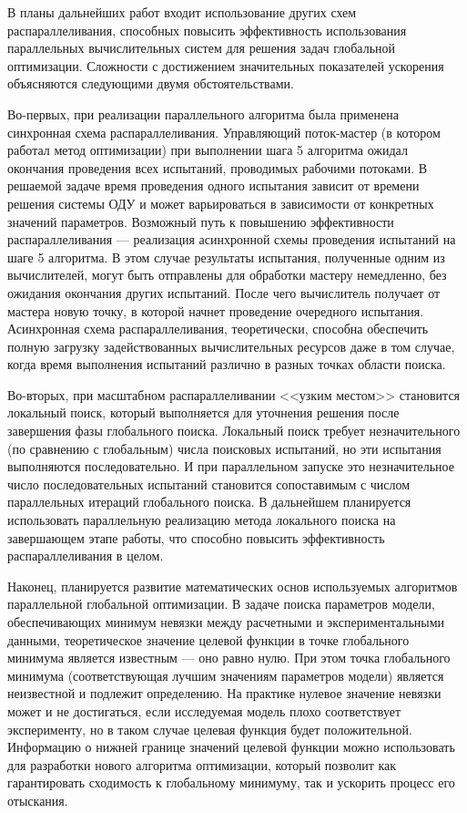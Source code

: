 \documentclass{cmi}
\begin{document}
В планы дальнейших работ входит использование других схем распараллеливания, способных повысить эффективность использования параллельных вычислительных систем для решения задач глобальной оптимизации. Сложности с достижением значительных показателей ускорения объясняются следующими двумя обстоятельствами. 

Во-первых, при реализации параллельного алгоритма была применена синхронная схема распараллеливания. Управляющий поток-мастер (в котором работал метод оптимизации) при выполнении  шага 5 алгоритма ожидал окончания проведения всех испытаний, проводимых рабочими потоками. В решаемой задаче время проведения одного испытания зависит от времени решения системы ОДУ и может варьироваться в зависимости от конкретных значений параметров. Возможный путь к повышению эффективности распараллеливания --- реализация асинхронной схемы проведения испытаний на шаге 5 алгоритма. В этом случае результаты испытания, полученные одним из вычислителей, могут быть отправлены для обработки мастеру немедленно, без ожидания окончания других испытаний. После чего вычислитель получает от мастера новую точку, в которой начнет проведение очередного испытания. Асинхронная схема распараллеливания, теоретически, способна обеспечить полную загрузку задействованных вычислительных ресурсов даже в том случае, когда время выполнения испытаний различно в разных точках области поиска.
 
Во-вторых, при масштабном распараллеливании <<узким местом>> становится локальный поиск, который выполняется для уточнения решения после завершения фазы глобального поиска. Локальный поиск требует незначительного (по сравнению с глобальным) числа поисковых испытаний, но эти испытания выполняются последовательно. И при параллельном запуске это незначительное число последовательных испытаний становится сопоставимым с числом параллельных итераций глобального поиска. В дальнейшем планируется использовать параллельную реализацию метода локального поиска на завершающем этапе работы, что способно повысить эффективность распараллеливания в целом.

Наконец, планируется развитие математических основ используемых алгоритмов параллельной глобальной оптимизации. 
В задаче поиска параметров модели, обеспечивающих минимум невязки между расчетными и экспериментальными данными, теоретическое значение целевой функции в точке глобального минимума является известным --- оно равно нулю.
При этом точка глобального минимума (соответствующая лучшим значениям параметров модели) является неизвестной и подлежит определению.
На практике нулевое значение невязки может и не достигаться, если исследуемая модель плохо соответствует эксперименту, но в таком случае целевая функция будет положительной.  
Информацию о нижней границе значений целевой функции можно использовать для разработки нового алгоритма оптимизации, который позволит как гарантировать сходимость к глобальному минимуму, так и ускорить процесс его отыскания.
\end{document}
